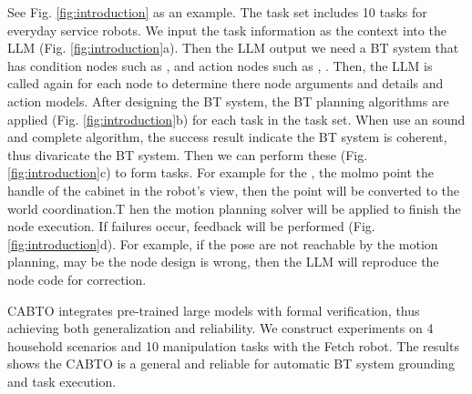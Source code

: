 \documentclass{article}
\begin{document}
See Fig. \ref{fig:introduction} as an example. The task set includes 10 tasks for everyday service robots. We input the task information as the context into the LLM (Fig. \ref{fig:introduction}a). Then the LLM output we need a BT system that has condition nodes such as  ,  and action nodes such as , . Then, the LLM is called again for each node to determine there node arguments and details and action models. After designing the BT system, the BT planning algorithms are applied (Fig. \ref{fig:introduction}b) for each task in the task set. When use an sound and complete algorithm, the success result indicate the BT system is coherent, thus divaricate the BT system. Then we can perform these (Fig. \ref{fig:introduction}c) to form tasks. For example for the , the molmo point the handle of the cabinet in the robot's view, then the point will be converted to the world coordination.T hen the motion planning solver will be applied to finish the node execution. If failures occur, feedback will be performed (Fig. \ref{fig:introduction}d). For example, if the pose are not reachable by the motion planning, may be the node design is wrong, then the LLM will reproduce the node code for correction.

CABTO integrates pre-trained large models with formal verification, thus achieving both generalization and reliability. We construct experiments on 4 household scenarios and 10 manipulation tasks with the Fetch robot. The results shows the CABTO is a general and reliable for automatic BT system grounding and task execution.







\end{document}
